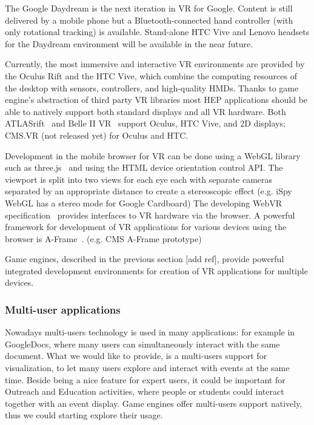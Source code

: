 \documentclass[12pt,a4paper]{article}
\begin{document}
The Google Daydream is the next iteration in VR for Google. Content is still delivered by a mobile phone but a
Bluetooth-connected hand controller (with only rotational tracking) is available. Stand-alone HTC Vive and Lenovo
headsets for the Daydream environment will be available in the near future.

Currently, the most immersive and interactive VR environments are provided by the Oculus Rift and the HTC Vive,
which combine the computing resources of the desktop with sensors, controllers, and high-quality HMDs. Thanks to
game engine’s abstraction of third party VR libraries most HEP applications should be able to natively support both
standard displays and all VR hardware. Both ATLASrift~\cite{ATLASRift} and Belle II VR~\cite{BelleIIVR} support Oculus, HTC Vive,
and 2D displays; CMS.VR (not released yet) for Oculus and HTC.

Development in the mobile browser for VR can be done using a WebGL library such as three.js~\cite{ThreeJSXXXX} and using the
HTML device orientation control API. The viewport is split into two views for each eye each with separate cameras separated
by an appropriate distance to create a stereoscopic effect (e.g. iSpy WebGL has a stereo mode for Google Cardboard)
The developing WebVR specification~\cite{WebVR} provides interfaces to VR hardware via the browser. A powerful framework for
development of VR applications for various devices using the browser is A-Frame~\cite{AFrame}. (e.g. CMS A-Frame prototype)

Game engines, described in the previous section [add ref],  provide powerful integrated development environments for creation
of VR applications for multiple devices.

\hypertarget{multi-user}{%
\subsubsection{Multi-user applications}\label{multi-user}}

Nowadays multi-users technology is used in many applications: for example in GoogleDocs, where many users can simultaneously
interact with the same document. What we would like to provide, is a multi-users support for visualization, to let many users
explore and interact with events at the same time. Beside being a nice feature for expert users, it could be important for
Outreach and Education activities, where people or students could interact together with an event display.
Game engines offer multi-users support natively, thus we could starting explore their usage.
\end{document}
